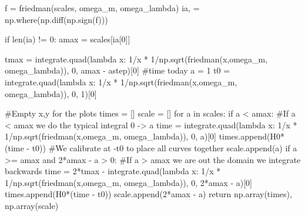 \documentclass[
  letterpaper,
  DIV=11,
  numbers=noendperiod]{scrreprt}
\newenvironment{Shaded}{\begin{snugshade}}{\end{snugshade}}
\newcommand{\BuiltInTok}[1]{\textcolor[rgb]{0.00,0.23,0.31}{#1}}
\newcommand{\CommentTok}[1]{\textcolor[rgb]{0.37,0.37,0.37}{#1}}
\newcommand{\ControlFlowTok}[1]{\textcolor[rgb]{0.00,0.23,0.31}{#1}}
\newcommand{\DecValTok}[1]{\textcolor[rgb]{0.68,0.00,0.00}{#1}}
\newcommand{\KeywordTok}[1]{\textcolor[rgb]{0.00,0.23,0.31}{#1}}
\newcommand{\NormalTok}[1]{\textcolor[rgb]{0.00,0.23,0.31}{#1}}
\newcommand{\OperatorTok}[1]{\textcolor[rgb]{0.37,0.37,0.37}{#1}}
\begin{document}
\begin{Shaded}
\begin{Highlighting}[]
\NormalTok{    f }\OperatorTok{=}\NormalTok{ friedman(scales, omega\_m, omega\_lambda)}
\NormalTok{    ia, }\OperatorTok{=}\NormalTok{ np.where(np.diff(np.sign(f)))}

    \ControlFlowTok{if} \BuiltInTok{len}\NormalTok{(ia) }\OperatorTok{!=} \DecValTok{0}\NormalTok{:}
\NormalTok{        amax }\OperatorTok{=}\NormalTok{ scales[ia[}\DecValTok{0}\NormalTok{]]}
    
\NormalTok{    tmax }\OperatorTok{=}\NormalTok{ integrate.quad(}\KeywordTok{lambda}\NormalTok{ x: }\DecValTok{1}\OperatorTok{/}\NormalTok{x }\OperatorTok{*} \DecValTok{1}\OperatorTok{/}\NormalTok{np.sqrt(friedman(x,omega\_m, omega\_lambda)), }\DecValTok{0}\NormalTok{, amax }\OperatorTok{{-}}\NormalTok{ astep)[}\DecValTok{0}\NormalTok{]}
    \CommentTok{\#time today a = 1}
\NormalTok{    t0 }\OperatorTok{=}\NormalTok{ integrate.quad(}\KeywordTok{lambda}\NormalTok{ x: }\DecValTok{1}\OperatorTok{/}\NormalTok{x }\OperatorTok{*} \DecValTok{1}\OperatorTok{/}\NormalTok{np.sqrt(friedman(x,omega\_m, omega\_lambda)), }\DecValTok{0}\NormalTok{, }\DecValTok{1}\NormalTok{)[}\DecValTok{0}\NormalTok{]}

    \CommentTok{\#Empty x,y for the plots}
\NormalTok{    times }\OperatorTok{=}\NormalTok{ []}
\NormalTok{    scale }\OperatorTok{=}\NormalTok{ []}
    \ControlFlowTok{for}\NormalTok{ a }\KeywordTok{in}\NormalTok{ scales:}
        \ControlFlowTok{if}\NormalTok{ a }\OperatorTok{\textless{}}\NormalTok{ amax: }\CommentTok{\#If a \textless{} amax we do the typical integral 0 {-}\textgreater{} a}
\NormalTok{            time }\OperatorTok{=}\NormalTok{ integrate.quad(}\KeywordTok{lambda}\NormalTok{ x: }\DecValTok{1}\OperatorTok{/}\NormalTok{x }\OperatorTok{*} \DecValTok{1}\OperatorTok{/}\NormalTok{np.sqrt(friedman(x,omega\_m, omega\_lambda)), }\DecValTok{0}\NormalTok{, a)[}\DecValTok{0}\NormalTok{]}
\NormalTok{            times.append(H0}\OperatorTok{*}\NormalTok{(time }\OperatorTok{{-}}\NormalTok{ t0)) }\CommentTok{\#We calibrate at {-}t0 to place all curves together}
\NormalTok{            scale.append(a)}
        \ControlFlowTok{if}\NormalTok{ a }\OperatorTok{\textgreater{}=}\NormalTok{ amax }\KeywordTok{and} \DecValTok{2}\OperatorTok{*}\NormalTok{amax }\OperatorTok{{-}}\NormalTok{ a }\OperatorTok{\textgreater{}} \DecValTok{0}\NormalTok{: }\CommentTok{\#If a \textgreater{} amax we are out the domain we integrate backwards}
\NormalTok{            time }\OperatorTok{=} \DecValTok{2}\OperatorTok{*}\NormalTok{tmax }\OperatorTok{{-}}\NormalTok{ integrate.quad(}\KeywordTok{lambda}\NormalTok{ x: }\DecValTok{1}\OperatorTok{/}\NormalTok{x }\OperatorTok{*} \DecValTok{1}\OperatorTok{/}\NormalTok{np.sqrt(friedman(x,omega\_m, omega\_lambda)), }\DecValTok{0}\NormalTok{, }\DecValTok{2}\OperatorTok{*}\NormalTok{amax }\OperatorTok{{-}}\NormalTok{ a)[}\DecValTok{0}\NormalTok{]}
\NormalTok{            times.append(H0}\OperatorTok{*}\NormalTok{(time }\OperatorTok{{-}}\NormalTok{ t0))}
\NormalTok{            scale.append(}\DecValTok{2}\OperatorTok{*}\NormalTok{amax }\OperatorTok{{-}}\NormalTok{ a)}
    \ControlFlowTok{return}\NormalTok{ np.array(times), np.array(scale)}


\end{Highlighting}
\end{Shaded}
\end{document}
